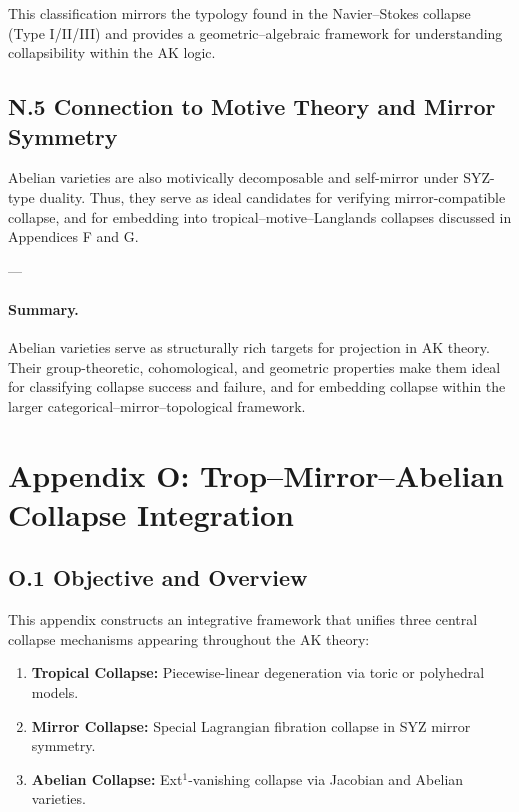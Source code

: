\documentclass[11pt]{article}
\begin{document}
\begin{axiom}
\begin{axiom}
{{This classification mirrors the typology found in the Navier–Stokes collapse (Type I/II/III) and provides a geometric–algebraic framework for understanding collapsibility within the AK logic.

\subsection*{N.5 Connection to Motive Theory and Mirror Symmetry}

Abelian varieties are also motivically decomposable and self-mirror under SYZ-type duality.  
Thus, they serve as ideal candidates for verifying mirror-compatible collapse, and for embedding into tropical–motive–Langlands collapses discussed in Appendices F and G.

---

\paragraph{Summary.}

Abelian varieties serve as structurally rich targets for projection in AK theory.  
Their group-theoretic, cohomological, and geometric properties make them ideal for classifying collapse success and failure, and for embedding collapse within the larger categorical–mirror–topological framework.



\section*{Appendix O: Trop--Mirror--Abelian Collapse Integration}

\subsection*{O.1 Objective and Overview}

This appendix constructs an integrative framework that unifies three central collapse mechanisms  
appearing throughout the AK theory:

\begin{enumerate}
  \item \textbf{Tropical Collapse:} Piecewise-linear degeneration via toric or polyhedral models.
  \item \textbf{Mirror Collapse:} Special Lagrangian fibration collapse in SYZ mirror symmetry.
  \item \textbf{Abelian Collapse:} Ext$^1$-vanishing collapse via Jacobian and Abelian varieties.
\end{enumerate}

}}
\end{axiom}
\end{axiom}
\end{document}
